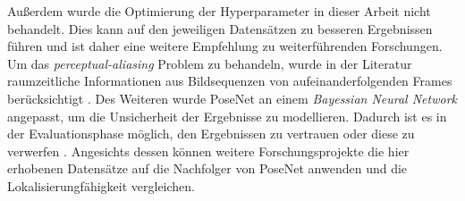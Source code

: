 Außerdem wurde die Optimierung der Hyperparameter in dieser Arbeit nicht behandelt. Dies kann auf den jeweiligen Datensätzen zu besseren Ergebnissen führen und ist daher eine weitere Empfehlung zu weiterführenden Forschungen. Um das \textit{perceptual-aliasing} Problem zu behandeln, wurde in der Literatur raumzeitliche Informationen aus Bildsequenzen von aufeinanderfolgenden Frames berücksichtigt \cite{walchImageBasedLocalizationUsing2017, clarkVidLocDeepSpatioTemporal2017}. Des Weiteren wurde PoseNet an einem \textit{Bayessian Neural Network} angepasst, um die Unsicherheit der Ergebnisse zu modellieren. Dadurch ist es in der Evaluationsphase möglich, den Ergebnissen zu vertrauen oder diese zu verwerfen \cite{kendallModellingUncertaintyDeep2016}. Angesichts dessen können weitere Forschungsprojekte die hier erhobenen Datensätze auf die Nachfolger von PoseNet \cite{kendallModellingUncertaintyDeep2016, walchImageBasedLocalizationUsing2017, clarkVidLocDeepSpatioTemporal2017} anwenden und die Lokalisierungfähigkeit vergleichen.